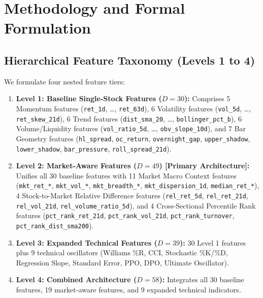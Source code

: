 \documentclass[11pt,a4paper]{article}
\begin{document}
\section{Methodology and Formal Formulation}

\subsection{Hierarchical Feature Taxonomy (Levels 1 to 4)}
We formulate four nested feature tiers:
\begin{enumerate}
    \item \textbf{Level 1: Baseline Single-Stock Features ($D=30$):} Comprises 5 Momentum features (\texttt{ret\_1d}, \dots, \texttt{ret\_63d}), 6 Volatility features (\texttt{vol\_5d}, \dots, \texttt{ret\_skew\_21d}), 6 Trend features (\texttt{dist\_sma\_20}, \dots, \texttt{bollinger\_pct\_b}), 6 Volume/Liquidity features (\texttt{vol\_ratio\_5d}, \dots, \texttt{obv\_slope\_10d}), and 7 Bar Geometry features (\texttt{hl\_spread}, \texttt{oc\_return}, \texttt{overnight\_gap}, \texttt{upper\_shadow}, \texttt{lower\_shadow}, \texttt{bar\_pressure}, \texttt{roll\_spread\_21d}).
    \item \textbf{Level 2: Market-Aware Features ($D=49$) [Primary Architecture]:} Unifies all 30 baseline features with 11 Market Macro Context features (\texttt{mkt\_ret\_*}, \texttt{mkt\_vol\_*}, \texttt{mkt\_breadth\_*}, \texttt{mkt\_dispersion\_1d}, \texttt{median\_ret\_*}), 4 Stock-to-Market Relative Difference features (\texttt{rel\_ret\_5d}, \texttt{rel\_ret\_21d}, \texttt{rel\_vol\_21d}, \texttt{rel\_volume\_ratio\_5d}), and 4 Cross-Sectional Percentile Rank features (\texttt{pct\_rank\_ret\_21d}, \texttt{pct\_rank\_vol\_21d}, \texttt{pct\_rank\_turnover}, \texttt{pct\_rank\_dist\_sma200}).
    \item \textbf{Level 3: Expanded Technical Features ($D=39$):} 30 Level 1 features plus 9 technical oscillators (Williams \%R, CCI, Stochastic \%K/\%D, Regression Slope, Standard Error, PPO, DPO, Ultimate Oscillator).
    \item \textbf{Level 4: Combined Architecture ($D=58$):} Integrates all 30 baseline features, 19 market-aware features, and 9 expanded technical indicators.
\end{enumerate}
\end{document}
